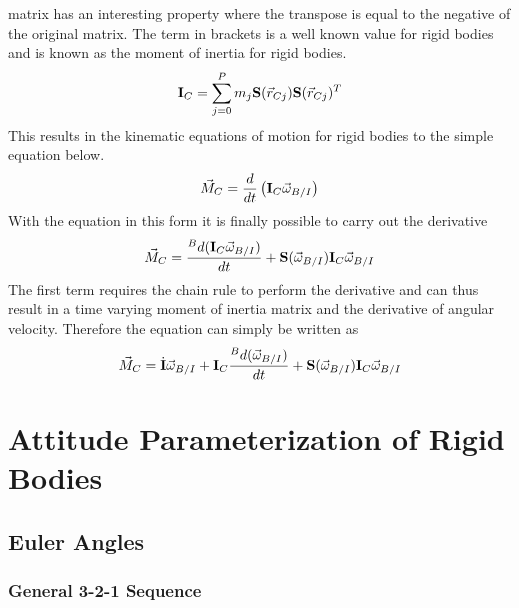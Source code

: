 \documentclass{article}
\begin{document}
matrix has an interesting property where the transpose is equal to the
negative of the original matrix. The term in brackets is a well known
value for rigid bodies and is known as the moment of inertia for rigid
bodies. 
\begin{equation}
{\bf I}_C =  \sum\limits_{j=0}^P m_j{\bf S}(\vec{r}_{Cj}){\bf
  S}(\vec{r}_{Cj})^T
\end{equation}
This results in the kinematic equations of motion for rigid bodies to
the simple equation below.
\begin{equation}
\vec{M}_C =  \frac{d}{dt}\left({\bf I}_C\vec{\omega}_{B/I} \right)
\end{equation}
With the equation in this form it is finally possible to carry out the
derivative
\begin{equation}
\vec{M}_C = \frac{{}^Bd ({\bf I}_C\vec{\omega}_{B/I})}{dt} + {\bf
  S}(\vec{\omega}_{B/I}){\bf I}_C\vec{\omega}_{B/I}
\end{equation}
The first term requires the chain rule to perform the derivative and
can thus result in a time varying moment of inertia matrix and the
derivative of angular velocity. Therefore the equation can simply be written as
\begin{equation}
\vec{M}_C = \dot{{\bf I}}\vec{\omega}_{B/I} + {\bf I}_C\frac{{}^Bd (\vec{\omega}_{B/I})}{dt} + {\bf
  S}(\vec{\omega}_{B/I}){\bf I}_C\vec{\omega}_{B/I}
\end{equation}

\section{Attitude Parameterization of Rigid Bodies}

\subsection{Euler Angles}\label{s:Euler_Angles}

\subsubsection{General 3-2-1 Sequence}
\end{document}
